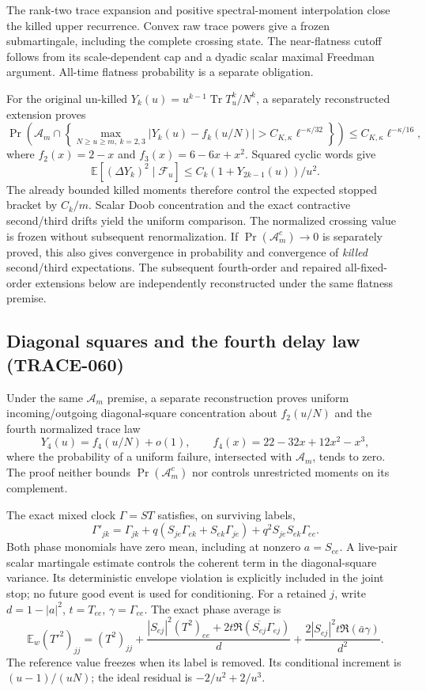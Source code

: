 The rank-two trace expansion and positive spectral-moment interpolation
close the killed upper recurrence. Convex raw trace powers give a frozen
submartingale, including the complete crossing state. The near-flatness
cutoff follows from its scale-dependent cap and a dyadic scalar maximal
Freedman argument. All-time flatness probability is a separate obligation.

For the original un-killed $Y_k(u)=u^{k-1}\operatorname{Tr}T_u^k/N^k$,
a separately reconstructed extension proves
\[
 \Pr\!\left(\mathcal A_m\cap
 \left\{\max_{N\ge u\ge m,\ k=2,3}|Y_k(u)-f_k(u/N)|
                    >C_{K,\kappa}\ell^{-\kappa/32}\right\}\right)
 \le C_{K,\kappa}\ell^{-\kappa/16},
\]
where $f_2(x)=2-x$ and $f_3(x)=6-6x+x^2$. Squared cyclic words give
\[
 \mathbb E[(\Delta Y_k)^2\mid\mathcal F_u]
           \le C_k(1+Y_{2k-1}(u))/u^2.
\]
The already bounded killed moments therefore control the expected stopped
bracket by $C_k/m$. Scalar Doob concentration and the exact contractive
second/third drifts yield the uniform comparison. The normalized crossing
value is frozen without subsequent renormalization. If
$\Pr(\mathcal A_m^c)\to0$ is separately proved, this also gives convergence
in probability and convergence of \emph{killed} second/third expectations.
The subsequent fourth-order and repaired all-fixed-order extensions below
are independently reconstructed under the same flatness premise.

\subsection{Diagonal squares and the fourth delay law (TRACE-060)}
Under the same $\mathcal A_m$ premise, a separate reconstruction proves
uniform incoming/outgoing diagonal-square concentration about $f_2(u/N)$
and the fourth normalized trace law
\[
 Y_4(u)=f_4(u/N)+o(1),\qquad
 f_4(x)=22-32x+12x^2-x^3,
\]
where the probability of a uniform failure, intersected with $\mathcal A_m$,
tends to zero. The proof neither bounds $\Pr(\mathcal A_m^c)$ nor controls
unrestricted moments on its complement.

The exact mixed clock $\Gamma=ST$ satisfies, on surviving labels,
\[
 \Gamma'_{jk}=\Gamma_{jk}
 +q(S_{je}\Gamma_{ek}+S_{ek}\Gamma_{je})
 +q^2 S_{je}S_{ek}\Gamma_{ee}.
\]
Both phase monomials have zero mean, including at nonzero $a=S_{ee}$.
A live-pair scalar martingale estimate controls the coherent term in the
diagonal-square variance. Its deterministic envelope violation is explicitly
included in the joint stop; no future good event is used for conditioning.
For a retained $j$, write $d=1-|a|^2$, $t=T_{ee}$, $\gamma=\Gamma_{ee}$.
The exact phase average is
\[
 \mathbb E_w(T'^2)_{jj}=(T^2)_{jj}
 +\frac{|S_{ej}|^2(T^2)_{ee}
         +2t\Re(\overline{S_{ej}}\Gamma_{ej})}{d}
 +\frac{2|S_{ej}|^2t\Re(\bar a\gamma)}{d^2}.
\]
The reference value freezes when its label is removed. Its conditional
increment is $(u-1)/(uN)$; the ideal residual is $-2/u^2+2/u^3$.

